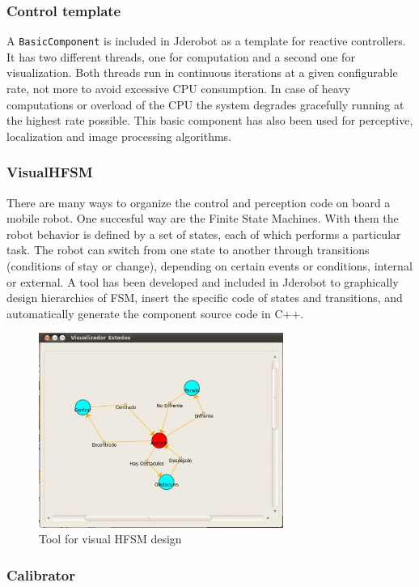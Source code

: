 \documentclass[twocolumn]{svjour3}          %
\begin{document}
\subsubsection{Control template}

A \texttt{BasicComponent} is included in Jderobot as a template for reactive controllers. It has two different threads, one for computation and a second one for visualization. Both threads run in continuous iterations at a given configurable rate, not more to avoid excessive CPU consumption. In case of heavy computations or overload of the CPU the system degrades gracefully running at the highest rate possible. This basic component has also been used for perceptive, localization and image processing algorithms.

\subsubsection{VisualHFSM}

There are many ways to organize the control and perception code on board a mobile robot. One succesful way are the Finite State Machines. With them the robot behavior is defined by a set of states, each of which performs a particular task. The robot can switch from one state to another through transitions (conditions of stay or change), depending on certain events or conditions, internal or external. A tool has been developed and included in Jderobot to graphically design hierarchies of FSM, insert the specific code of states and transitions, and automatically generate the component source code in C++.

\begin{figure}[h!]
  \includegraphics[width=8cm]{figs/ratonGatoAutoEjec.jpg}
\caption{Tool for visual HFSM design}
\label{fig:visualHFSM}
\end{figure}

\subsubsection{Calibrator}
\end{document}
